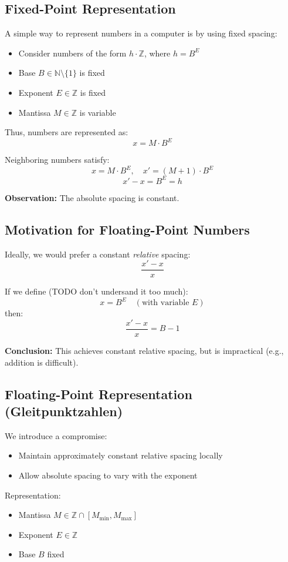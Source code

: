 \documentclass{article}
\begin{document}
\subsection{Fixed-Point Representation}
A simple way to represent numbers in a computer is by using fixed spacing:
\begin{itemize}
  \item Consider numbers of the form $h \cdot \mathbb{Z}$, where $h = B^E$
  \item Base $B \in \mathbb{N} \setminus \{1\}$ is fixed
  \item Exponent $E \in \mathbb{Z}$ is fixed
  \item Mantissa $M \in \mathbb{Z}$ is variable
\end{itemize}

Thus, numbers are represented as:
\[
x = M \cdot B^E
\]

Neighboring numbers satisfy:
\[
x = M \cdot B^E, \quad x' = (M+1)\cdot B^E
\]
\[
x' - x = B^E = h
\]

\textbf{Observation:} The absolute spacing is constant.

\subsection{Motivation for Floating-Point Numbers}
Ideally, we would prefer a constant \textit{relative} spacing:
\[
\frac{x' - x}{x}
\]

If we define (TODO don't undersand it too much):
\[
x = B^E \quad (\text{with variable } E)
\]
then:
\[
\frac{x' - x}{x} = B - 1
\]

\textbf{Conclusion:} This achieves constant relative spacing, but is impractical (e.g., addition is difficult).

\subsection{Floating-Point Representation (Gleitpunktzahlen)}
We introduce a compromise:
\begin{itemize}
  \item Maintain approximately constant relative spacing locally
  \item Allow absolute spacing to vary with the exponent
\end{itemize}

Representation:
\begin{itemize}
  \item Mantissa $M \in \mathbb{Z} \cap [M_{\min}, M_{\max}]$
  \item Exponent $E \in \mathbb{Z}$
  \item Base $B$ fixed
\end{itemize}
\end{document}
